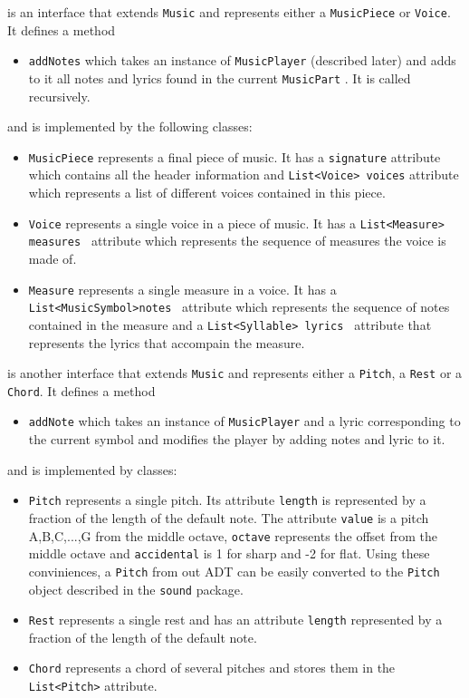 \documentclass[12pt]{book}
\begin{document}
\medskip 

 is an interface that extends {\tt Music} and represents either a {\tt MusicPiece} or {\tt Voice}.  It defines a method
\begin{itemize} 
\item { \tt addNotes} which takes an instance of  {\tt MusicPlayer} (described later) and adds to it all notes and lyrics found in the current {\tt MusicPart}  . It is called recursively.
\end{itemize}

\noindent and is implemented by the following classes:
\begin{itemize} 
\item { \tt MusicPiece} represents a final piece of music.   It has a {\tt signature} attribute which contains all the header information and {\tt List<Voice> voices} attribute which represents a list of different voices contained in this piece.
\item {\tt Voice}  represents a single voice in a piece of music. It has a {\tt List<Measure> measures } attribute which represents the sequence of measures the voice is made of.
\item {\tt Measure}  represents a single measure in a voice. It has a {\tt List<MusicSymbol>notes } attribute which represents the sequence of notes contained in the measure and a  {\tt List<Syllable> lyrics } attribute that represents the lyrics that accompain the measure.
\end{itemize}

\bigskip

 is another interface that extends {\tt Music} and represents either a {\tt Pitch}, a {\tt Rest} or a {\tt Chord}. It defines a method
\begin{itemize} 
\item { \tt addNote} which takes an instance of  {\tt MusicPlayer} and a lyric corresponding to the current symbol and modifies the player by adding notes and lyric to it. 
\end{itemize}
\noindent and is implemented by classes:
\begin{itemize} 
\item { \tt Pitch} represents a single pitch. Its attribute {\tt length} is represented by a fraction  of the length of the default note. The attribute {\tt value} is a pitch A,B,C,...,G from the middle octave,  {\tt octave} represents the offset from the middle octave and  {\tt accidental} is 1 for sharp and -2 for flat. Using these conviniences,  a {\tt Pitch} from out ADT can be easily converted to the {\tt Pitch} object described in the {\tt sound} package.
\item { \tt Rest} represents a single rest and has an attribute {\tt length}  represented by a fraction of the length of the default note. 
\item {\tt Chord} represents a chord of several pitches and stores them in the {\tt List<Pitch>} attribute.
\end{itemize}
\end{document}
